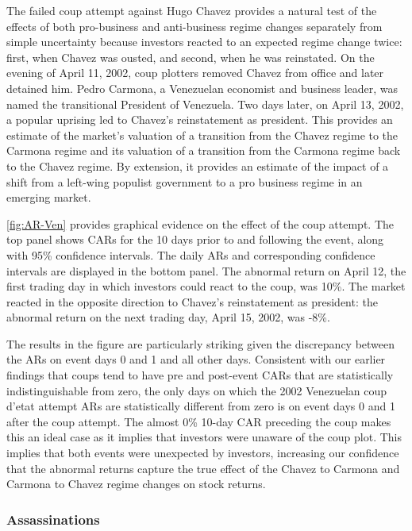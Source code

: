 \documentclass[12pt,final,fleqn]{article}
\theoremstyle{plain}
\begin{document}
The failed coup attempt against Hugo Chavez provides a natural test of the effects of both pro-business and anti-business regime changes separately from simple uncertainty because investors reacted to an expected regime change twice: first, when Chavez was ousted, and second, when he was reinstated. On the evening of April 11, 2002, coup plotters removed Chavez from office and later detained him. Pedro Carmona, a Venezuelan economist and business leader, was named the transitional President of Venezuela. Two days later, on April 13, 2002, a popular uprising led to Chavez's reinstatement as president. This provides an estimate of the market's valuation of a transition from the Chavez regime to the Carmona regime and its valuation of a transition from the Carmona regime back to the Chavez regime. By extension, it provides an estimate of the impact of a shift from a left-wing populist government to a pro business regime in an emerging market. 

\autoref{fig:AR-Ven} provides graphical evidence on the effect of the coup attempt. The top panel shows CARs for the 10 days prior to and following the event, along with 95\% confidence intervals. The daily ARs and corresponding confidence intervals are displayed in the bottom panel. The abnormal return on April 12, the first trading day in which investors could react to the coup, was 10\%. The market reacted in the opposite direction to Chavez's reinstatement as president: the abnormal return on the next trading day, April 15, 2002, was -8\%.

The results in the figure are particularly striking given the discrepancy between the ARs on event days 0 and 1 and all other days. Consistent with our earlier findings that coups tend to have pre and post-event CARs that are statistically indistinguishable from zero, the only days on which the 2002 Venezuelan coup d'etat attempt ARs are statistically different from zero is on event days 0 and 1 after the coup attempt. The almost 0\% 10-day CAR preceding the coup makes this an ideal case as it implies that investors were unaware of the coup plot. This implies that both events were unexpected by investors, increasing our confidence that the abnormal returns capture the true effect of the Chavez to Carmona and Carmona to Chavez regime changes on stock returns.

\subsubsection{Assassinations} \label{subsec: Assassinations}
\end{document}
